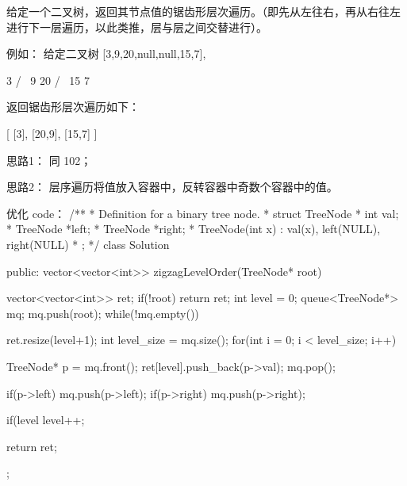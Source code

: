给定一个二叉树，返回其节点值的锯齿形层次遍历。（即先从左往右，再从右往左进行下一层遍历，以此类推，层与层之间交替进行）。

例如：
给定二叉树 [3,9,20,null,null,15,7],

    3
   / \
  9  20
    /  \
   15   7

返回锯齿形层次遍历如下：

[
  [3],
  [20,9],
  [15,7]
]




















思路1：
同 102；

思路2：
层序遍历将值放入容器中，反转容器中奇数个容器中的值。




















优化 code：
/**
 * Definition for a binary tree node.
 * struct TreeNode {
 *     int val;
 *     TreeNode *left;
 *     TreeNode *right;
 *     TreeNode(int x) : val(x), left(NULL), right(NULL) {}
 * };
 */
class Solution {
public:
    vector<vector<int>> zigzagLevelOrder(TreeNode* root) {
        vector<vector<int>> ret;
        if(!root) return ret;
        int level = 0;
        queue<TreeNode*> mq;
        mq.push(root);
        while(!mq.empty())
        {
            ret.resize(level+1);
            int level_size = mq.size();
            for(int i = 0; i < level_size; i++)
            {
                TreeNode* p = mq.front();
                ret[level].push_back(p->val);
                mq.pop();

                if(p->left) mq.push(p->left);
                if(p->right) mq.push(p->right);
            }
            if(level%
            level++;
        }
        return ret;
    }
};



















